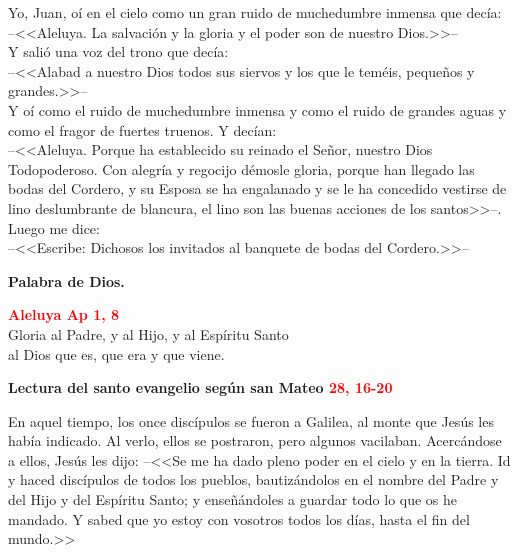 \documentclass[12pt, letterpaper, spanish]{report}
\begin{document}
\Large Yo, Juan, o\'i en el cielo como un gran ruido de muchedumbre inmensa que dec\'ia: \\
--<<Aleluya. La salvaci\'on y la gloria y el poder son de nuestro Dios.>>-- \\
Y sali\'o una voz del trono que dec\'ia: \\
--<<Alabad a nuestro Dios todos sus siervos y los que le tem\'eis, peque\~nos y grandes.>>-- \\
Y o\'i como el ruido de muchedumbre inmensa y como el ruido de grandes aguas y
como el fragor de fuertes truenos. Y dec\'ian: \\
--<<Aleluya. Porque ha establecido su reinado el Se\~nor, nuestro Dios \\ Todopoderoso.
Con alegr\'ia y regocijo d\'emosle gloria, porque han llegado las bodas del Cordero,
y su Esposa se ha engalanado y se le ha concedido vestirse de lino deslumbrante de blancura, el
lino son las buenas acciones de los santos>>--. \\
Luego me dice: \\
--<<Escribe: Dichosos los invitados al banquete de bodas del Cordero.>>-- \newline

{\bfseries Palabra de Dios.} \newline

\begin{center}
\Large {\bfseries \textcolor{red}{Aleluya \hspace{1cm} Ap 1, 8}} \\
Gloria al Padre, y al Hijo, y al Esp\'iritu Santo \\
al Dios que es, que era y que viene.
\end{center}

\newpage

\Huge \textcolor{red}{} \Large {\bfseries Lectura del santo evangelio seg\'un san Mateo \hspace{1cm} \textcolor{red}{28, 16-20}} \newline

\Large En aquel tiempo, los once disc\'ipulos se fueron a Galilea, al monte que Jes\'us les
hab\'ia indicado. \hfill \break
Al verlo, ellos se postraron, pero algunos vacilaban. \newline
Acerc\'andose a ellos, Jes\'us les dijo: \newline
--<<Se me ha dado pleno poder en el cielo y en la tierra. \newline
Id y haced disc\'ipulos de todos los pueblos, bautiz\'andolos en el nombre del Padre y del Hijo y
del Esp\'iritu Santo; y ense\~n\'andoles a guardar todo lo que os he mandado. \newline
Y sabed que yo estoy con vosotros todos los d\'ias, hasta el fin del mundo.>> \newline
\end{document}
